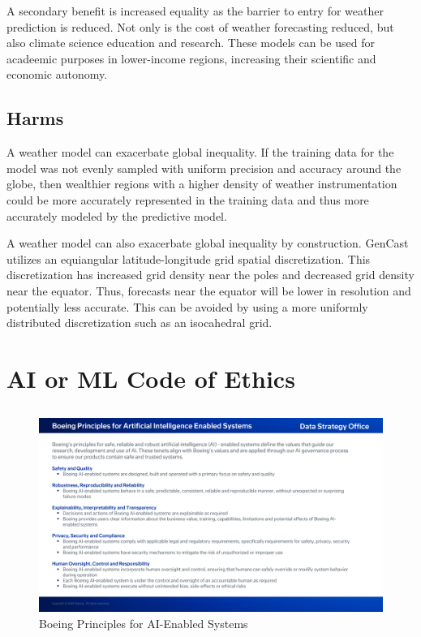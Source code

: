 \documentclass[11pt]{article}
\begin{document}
A secondary benefit is increased equality as the barrier to entry for weather
prediction is reduced. Not only is the cost of weather forecasting reduced, but
also climate science education and research. These models can be used for
acadeemic purposes in lower-income regions, increasing their scientific
and economic autonomy.

\subsection*{Harms} %
A weather model can exacerbate global inequality. If the training data for the
model was not evenly sampled with uniform precision and accuracy around the
globe, then wealthier regions with a higher density of weather instrumentation
could be more accurately represented in the training data and thus more
accurately modeled by the predictive model.

A weather model can also exacerbate global inequality by construction. GenCast
utilizes an equiangular latitude-longitude grid spatial discretization. This
discretization has increased grid density near the poles and decreased grid
density near the equator. Thus, forecasts near the equator will be lower in
resolution and potentially less accurate. This can be avoided by using a more
uniformly distributed discretization such as an isocahedral grid.

\section{AI or ML Code of Ethics}

\subsection{} %
\begin{figure}[H]
    \centering
    \includegraphics[width=6.5in]{BoeingPrinciplesforAIEnabledSystems.pdf}
    \caption{Boeing Principles for AI-Enabled Systems}
    \label{3afig1}
\end{figure}
\end{document}
